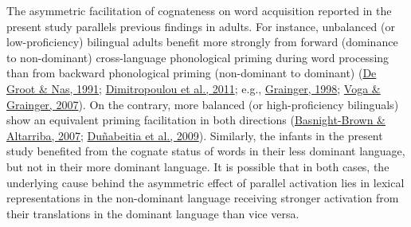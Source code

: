 \documentclass[
]{article}
\begin{document}
The asymmetric facilitation of cognateness on word acquisition reported
in the present study parallels previous findings in adults. For
instance, unbalanced (or low-proficiency) bilingual adults benefit more
strongly from forward (dominance to non-dominant) cross-language
phonological priming during word processing than from backward
phonological priming (non-dominant to dominant)
(\protect\hyperlink{ref-de1991lexical}{De Groot \& Nas, 1991};
\protect\hyperlink{ref-dimitropoulou2011masked}{Dimitropoulou et al.,
2011}; e.g., \protect\hyperlink{ref-grainger1998masked}{Grainger, 1998};
\protect\hyperlink{ref-voga2007cognate}{Voga \& Grainger, 2007}). On the
contrary, more balanced (or high-proficiency bilinguals) show an
equivalent priming facilitation in both directions
(\protect\hyperlink{ref-basnight2007differences}{Basnight-Brown \&
Altarriba, 2007};
\protect\hyperlink{ref-dunabeitia2009masked}{Duñabeitia et al., 2009}).
Similarly, the infants in the present study benefited from the cognate
status of words in their less dominant language, but not in their more
dominant language. It is possible that in both cases, the underlying
cause behind the asymmetric effect of parallel activation lies in
lexical representations in the non-dominant language receiving stronger
activation from their translations in the dominant language than vice
versa.
\end{document}
